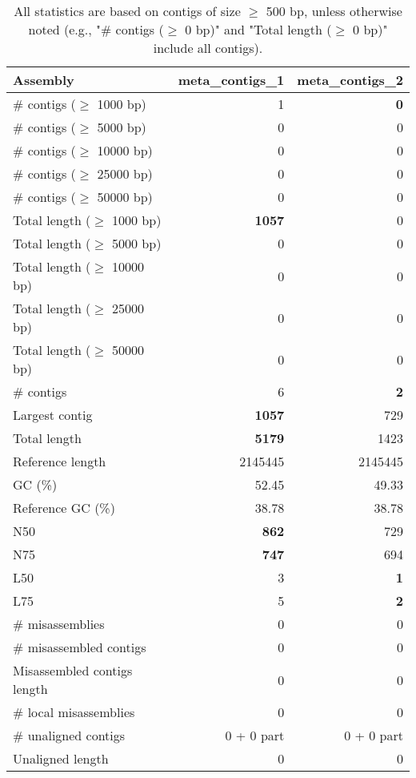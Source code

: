 \documentclass[12pt,a4paper]{article}
\begin{document}
\begin{table}[ht]
\begin{center}
\caption{All statistics are based on contigs of size $\geq$ 500 bp, unless otherwise noted (e.g., "\# contigs ($\geq$ 0 bp)" and "Total length ($\geq$ 0 bp)" include all contigs).}
\begin{tabular}{|l*{2}{|r}|}
\hline
Assembly & meta\_contigs\_1 & meta\_contigs\_2 \\ \hline
\# contigs ($\geq$ 1000 bp) & 1 & {\bf 0} \\ \hline
\# contigs ($\geq$ 5000 bp) & 0 & 0 \\ \hline
\# contigs ($\geq$ 10000 bp) & 0 & 0 \\ \hline
\# contigs ($\geq$ 25000 bp) & 0 & 0 \\ \hline
\# contigs ($\geq$ 50000 bp) & 0 & 0 \\ \hline
Total length ($\geq$ 1000 bp) & {\bf 1057} & 0 \\ \hline
Total length ($\geq$ 5000 bp) & 0 & 0 \\ \hline
Total length ($\geq$ 10000 bp) & 0 & 0 \\ \hline
Total length ($\geq$ 25000 bp) & 0 & 0 \\ \hline
Total length ($\geq$ 50000 bp) & 0 & 0 \\ \hline
\# contigs & 6 & {\bf 2} \\ \hline
Largest contig & {\bf 1057} & 729 \\ \hline
Total length & {\bf 5179} & 1423 \\ \hline
Reference length & 2145445 & 2145445 \\ \hline
GC (\%) & 52.45 & 49.33 \\ \hline
Reference GC (\%) & 38.78 & 38.78 \\ \hline
N50 & {\bf 862} & 729 \\ \hline
N75 & {\bf 747} & 694 \\ \hline
L50 & 3 & {\bf 1} \\ \hline
L75 & 5 & {\bf 2} \\ \hline
\# misassemblies & 0 & 0 \\ \hline
\# misassembled contigs & 0 & 0 \\ \hline
Misassembled contigs length & 0 & 0 \\ \hline
\# local misassemblies & 0 & 0 \\ \hline
\# unaligned contigs & 0 + 0 part & 0 + 0 part \\ \hline
Unaligned length & 0 & 0 \\ \hline

\end{tabular}
\end{center}
\end{table}
\end{document}
